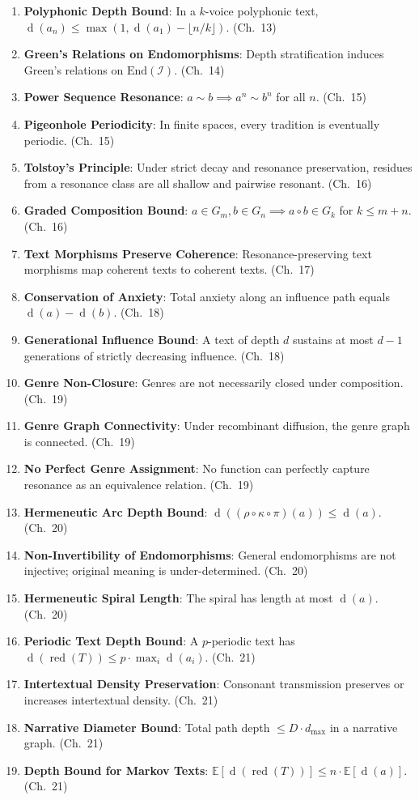 \documentclass[11pt,openany]{book}
\theoremstyle{definition}
\theoremstyle{plain}
\theoremstyle{remark}
\newcommand{\IS}{\mathcal{I}}               %
\newcommand{\compose}{\circ}                 %
\newcommand{\res}{\sim}                      %
\newcommand{\depth}{\operatorname{d}}       %
\begin{document}
\begin{enumerate}
\item \textbf{Polyphonic Depth Bound}: In a $k$-voice polyphonic text, $\depth(a_n) \leq \max(1, \depth(a_1) - \lfloor n/k \rfloor)$. (Ch.~13)
\item \textbf{Green's Relations on Endomorphisms}: Depth stratification induces Green's relations on $\mathrm{End}(\IS)$. (Ch.~14)
\item \textbf{Power Sequence Resonance}: $a \res b \implies a^n \res b^n$ for all $n$. (Ch.~15)
\item \textbf{Pigeonhole Periodicity}: In finite spaces, every tradition is eventually periodic. (Ch.~15)
\item \textbf{Tolstoy's Principle}: Under strict decay and resonance preservation, residues from a resonance class are all shallow and pairwise resonant. (Ch.~16)
\item \textbf{Graded Composition Bound}: $a \in G_m, b \in G_n \implies a \compose b \in G_k$ for $k \leq m+n$. (Ch.~16)
\item \textbf{Text Morphisms Preserve Coherence}: Resonance-preserving text morphisms map coherent texts to coherent texts. (Ch.~17)
\item \textbf{Conservation of Anxiety}: Total anxiety along an influence path equals $\depth(a) - \depth(b)$. (Ch.~18)
\item \textbf{Generational Influence Bound}: A text of depth $d$ sustains at most $d-1$ generations of strictly decreasing influence. (Ch.~18)
\item \textbf{Genre Non-Closure}: Genres are not necessarily closed under composition. (Ch.~19)
\item \textbf{Genre Graph Connectivity}: Under recombinant diffusion, the genre graph is connected. (Ch.~19)
\item \textbf{No Perfect Genre Assignment}: No function can perfectly capture resonance as an equivalence relation. (Ch.~19)
\item \textbf{Hermeneutic Arc Depth Bound}: $\depth((\rho \circ \kappa \circ \pi)(a)) \leq \depth(a)$. (Ch.~20)
\item \textbf{Non-Invertibility of Endomorphisms}: General endomorphisms are not injective; original meaning is under-determined. (Ch.~20)
\item \textbf{Hermeneutic Spiral Length}: The spiral has length at most $\depth(a)$. (Ch.~20)
\item \textbf{Periodic Text Depth Bound}: A $p$-periodic text has $\depth(\operatorname{red}(T)) \leq p \cdot \max_i \depth(a_i)$. (Ch.~21)
\item \textbf{Intertextual Density Preservation}: Consonant transmission preserves or increases intertextual density. (Ch.~21)
\item \textbf{Narrative Diameter Bound}: Total path depth $\leq D \cdot d_{\max}$ in a narrative graph. (Ch.~21)
\item \textbf{Depth Bound for Markov Texts}: $\mathbb{E}[\depth(\operatorname{red}(T))] \leq n \cdot \mathbb{E}[\depth(a)]$. (Ch.~21)
\end{enumerate}
\end{document}
